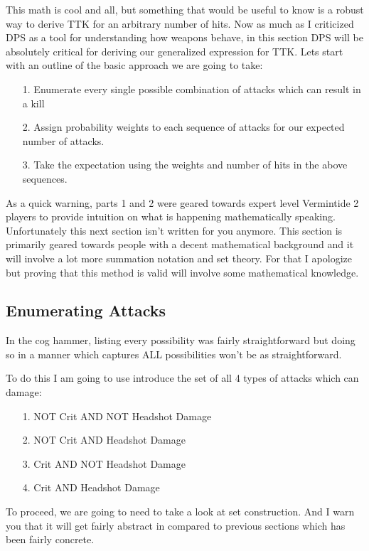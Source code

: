 \documentclass{article}
\begin{document}
This math is cool and all, but something that would be useful to know is a robust way to derive TTK for an arbitrary number of hits. Now as much as I criticized DPS as a tool for understanding how weapons behave, in this section DPS will be absolutely critical for deriving our generalized expression for TTK. Lets start with an outline of the basic approach we are going to take:

\begin{enumerate}
\item[1.] Enumerate every single possible combination of attacks which can result in a kill
\item[2.] Assign probability weights to each sequence of attacks for our expected number of attacks.
\item[3.] Take the expectation using the weights and number of hits in the above sequences.
\end{enumerate}

As a quick warning, parts 1 and 2 were geared towards expert level Vermintide 2 players to provide intuition on what is happening mathematically speaking. Unfortunately this next section isn't written for you anymore. This section is primarily geared towards people with a decent mathematical background and it will involve a lot more summation notation and set theory. For that I apologize but proving that this method is valid will involve some mathematical knowledge.

\subsection{Enumerating Attacks}
	In the cog hammer, listing every possibility was fairly straightforward but doing so in a manner which captures ALL possibilities won't be as straightforward.

	To do this I am going to use introduce the set of all 4 types of attacks which can damage:

\begin{enumerate}
\item[1.] NOT Crit AND NOT Headshot Damage
\item[2.] NOT Crit AND Headshot Damage
\item[3.] Crit AND NOT Headshot Damage
\item[4.] Crit AND Headshot Damage
\end{enumerate}

	To proceed, we are going to need to take a look at set construction. And I warn you that it will get fairly abstract in compared to previous sections which has been fairly concrete.
\end{document}
